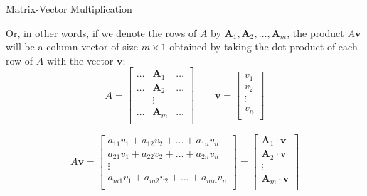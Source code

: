 \documentclass{beamer}
\begin{document}
\begin{frame}{Matrix-Vector Multiplication}

  Or, in other words, if we denote the rows of $A$ by \(\mathbf{A}_1, \mathbf{A}_2, \ldots, \mathbf{A}_m\), the product \(A\mathbf{v}\) will be a column vector of size \(m \times 1\) obtained by taking the dot product of each row of \(A\) with the vector \(\mathbf{v}\):
    \[
      A = \begin{bmatrix}
        \dots& \mathbf{A}_1 & \ldots \\
        \dots& \mathbf{A}_2 & \ldots \\
         & \vdots &  \\
        \dots& \mathbf{A}_m & \ldots \\
      \end{bmatrix}
      \qquad
      \mathbf{v} = \begin{bmatrix}
        v_1 \\
        v_2 \\
        \vdots \\
        v_n \\
      \end{bmatrix}
    \]

    \[
      A\mathbf{v} = \begin{bmatrix}
        a_{11}v_1 + a_{12}v_2 + \ldots + a_{1n}v_n \\
        a_{21}v_1 + a_{22}v_2 + \ldots + a_{2n}v_n \\
        \vdots \\
        a_{m1}v_1 + a_{m2}v_2 + \ldots + a_{mn}v_n \\
      \end{bmatrix}= \begin{bmatrix}
        \mathbf{A}_1 \cdot \mathbf{v} \\
        \mathbf{A}_2 \cdot \mathbf{v} \\
        \vdots \\
        \mathbf{A}_m \cdot \mathbf{v} \\
      \end{bmatrix} 
    \]
    



\end{frame}
\end{document}
